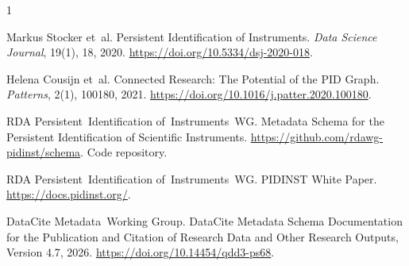\documentclass[titlepage=true,twoside=false,DIV=13]{scrartcl}
\begin{document}
%
%
\begin{thebibliography}{1}

Markus Stocker et~al.
\newblock Persistent Identification of Instruments.
\newblock \emph{Data Science Journal}, 19(1), 18, 2020.
\newblock \url{https://doi.org/10.5334/dsj-2020-018}.

Helena Cousijn et~al.
\newblock Connected Research: The Potential of the PID Graph.
\newblock \emph{Patterns}, 2(1), 100180, 2021.
\newblock \url{https://doi.org/10.1016/j.patter.2020.100180}.

RDA Persistent~Identification of~Instruments~WG.
\newblock Metadata Schema for the Persistent Identification of Scientific
  Instruments.
\newblock \url{https://github.com/rdawg-pidinst/schema}.
\newblock Code repository.

RDA Persistent~Identification of~Instruments~WG.
\newblock PIDINST White Paper.
\newblock \url{https://docs.pidinst.org/}.

DataCite Metadata~Working Group.
\newblock DataCite Metadata Schema Documentation for the Publication
  and Citation of Research Data and Other Research Outputs, Version
  4.7, 2026.
\newblock \url{https://doi.org/10.14454/qdd3-ps68}.

\end{thebibliography}
\end{document}
